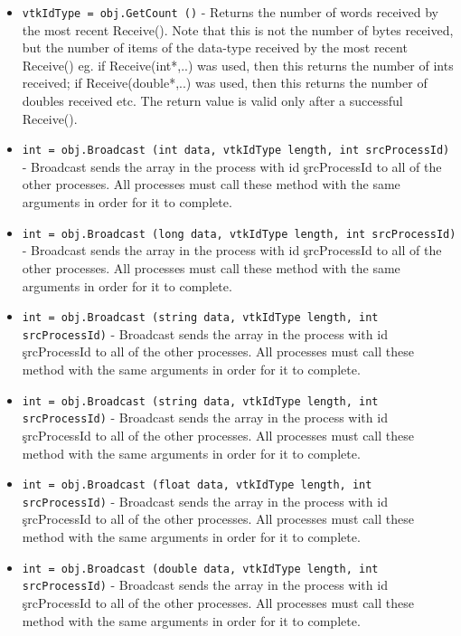 \begin{itemize}
\item  \verb|vtkIdType = obj.GetCount ()| -  Returns the number of words received by the most recent Receive().
 Note that this is not the number of bytes received, but the number of items
 of the data-type received by the most recent Receive() eg. if
 Receive(int*,..) was used, then this returns the number of ints received;
 if Receive(double*,..) was used, then this returns the number of doubles
 received etc. The return value is valid only after a successful Receive().

\item  \verb|int = obj.Broadcast (int data, vtkIdType length, int srcProcessId)| -  Broadcast sends the array in the process with id \c srcProcessId to all of
 the other processes.  All processes must call these method with the same
 arguments in order for it to complete.

\item  \verb|int = obj.Broadcast (long data, vtkIdType length, int srcProcessId)| -  Broadcast sends the array in the process with id \c srcProcessId to all of
 the other processes.  All processes must call these method with the same
 arguments in order for it to complete.

\item  \verb|int = obj.Broadcast (string data, vtkIdType length, int srcProcessId)| -  Broadcast sends the array in the process with id \c srcProcessId to all of
 the other processes.  All processes must call these method with the same
 arguments in order for it to complete.

\item  \verb|int = obj.Broadcast (string data, vtkIdType length, int srcProcessId)| -  Broadcast sends the array in the process with id \c srcProcessId to all of
 the other processes.  All processes must call these method with the same
 arguments in order for it to complete.

\item  \verb|int = obj.Broadcast (float data, vtkIdType length, int srcProcessId)| -  Broadcast sends the array in the process with id \c srcProcessId to all of
 the other processes.  All processes must call these method with the same
 arguments in order for it to complete.

\item  \verb|int = obj.Broadcast (double data, vtkIdType length, int srcProcessId)| -  Broadcast sends the array in the process with id \c srcProcessId to all of
 the other processes.  All processes must call these method with the same
 arguments in order for it to complete.


\end{itemize}
